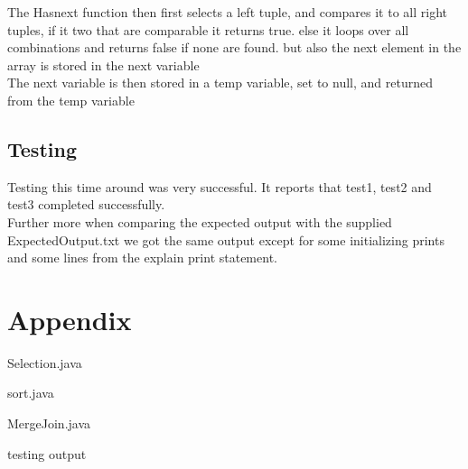 \documentclass[a4paper,10pt,titlepage]{report}
\begin{document}
The Hasnext function then first selects a left tuple, and compares it to all right tuples, if it two that are comparable it returns true. else it loops over all combinations and returns false if none are found. but also the next element in the array is stored in the next variable\\

The next variable is then stored in a temp variable, set to null, and returned from the temp variable


\subsection{Testing}
Testing this time around was very successful. It reports that test1, test2 and test3 completed successfully. \\
Further more when comparing the expected output with the supplied ExpectedOutput.txt we got the same output except for some initializing  prints and some lines from the explain print statement. \\

\section{Appendix}
Selection.java


sort.java


MergeJoin.java


testing output

\end{document}
